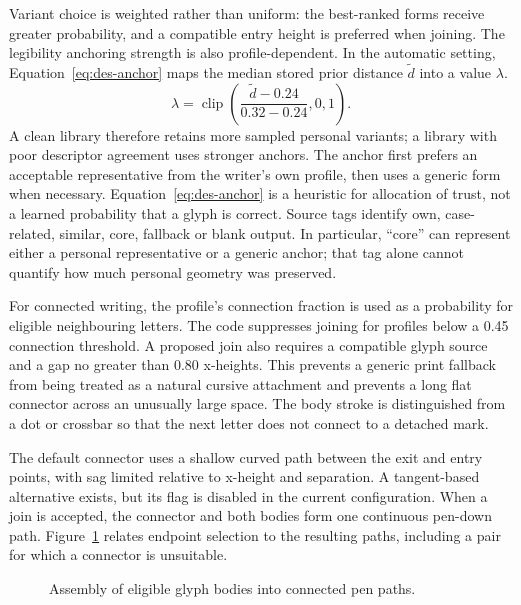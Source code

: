 Variant choice is weighted rather than uniform: the best-ranked forms receive greater probability, and a compatible entry height is preferred when joining. The legibility anchoring strength is also profile-dependent. In the automatic setting, Equation~\ref{eq:des-anchor} maps the median stored prior distance $\widetilde d$ into a value $\lambda$.
\begin{equation}
\lambda=\operatorname{clip}\left(\frac{\widetilde d-0.24}{0.32-0.24},0,1\right).
\label{eq:des-anchor}
\end{equation}
A clean library therefore retains more sampled personal variants; a library with poor descriptor agreement uses stronger anchors. The anchor first prefers an acceptable representative from the writer's own profile, then uses a generic form when necessary. Equation~\ref{eq:des-anchor} is a heuristic for allocation of trust, not a learned probability that a glyph is correct. Source tags identify own, case-related, similar, core, fallback or blank output. In particular, ``core'' can represent either a personal representative or a generic anchor; that tag alone cannot quantify how much personal geometry was preserved.

For connected writing, the profile's connection fraction is used as a probability for eligible neighbouring letters. The code suppresses joining for profiles below a 0.45 connection threshold. A proposed join also requires a compatible glyph source and a gap no greater than 0.80 x-heights. This prevents a generic print fallback from being treated as a natural cursive attachment and prevents a long flat connector across an unusually large space. The body stroke is distinguished from a dot or crossbar so that the next letter does not connect to a detached mark.

The default connector uses a shallow curved path between the exit and entry points, with sag limited relative to x-height and separation. A tangent-based alternative exists, but its flag is disabled in the current configuration. When a join is accepted, the connector and both bodies form one continuous pen-down path. Figure~\ref{fig:des-joins} relates endpoint selection to the resulting paths, including a pair for which a connector is unsuitable.
\begin{figure}[!htbp]\centering
{}
\caption{Assembly of eligible glyph bodies into connected pen paths.}
\label{fig:des-joins}
\end{figure}

